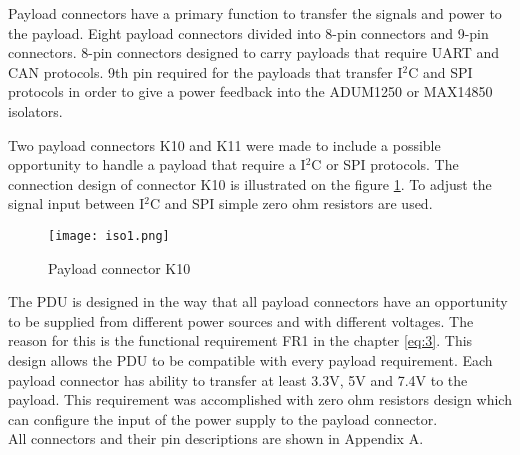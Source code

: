 Payload connectors have a primary function to transfer the signals and power to the payload. Eight payload connectors divided into 8-pin connectors and 9-pin connectors. 8-pin connectors designed to carry payloads that require UART and CAN protocols. 9th pin required for the payloads that transfer I$^2$C and SPI protocols in order to give a power feedback into the ADUM1250 or MAX14850 isolators.  

Two payload connectors K10 and K11 were made to include a possible opportunity to handle a payload that require a I$^2$C or SPI protocols.
The connection design of connector K10 is illustrated on the figure \ref{fig: iso1}. To adjust the signal input between I$^2$C and SPI simple zero ohm resistors are used.

\begin{figure}[h]
	\centering
	\texttt{[image: iso1.png]}
	\caption{Payload connector K10}
	\label{fig: iso1}
\end{figure} 
 
The PDU is designed in the way that all payload connectors have an opportunity to be supplied from different power sources and with different voltages. The reason for this is the functional requirement FR1 in the chapter \ref{eq:3}. This design allows the PDU to be compatible with every payload requirement. Each payload connector has ability to transfer at least 3.3V, 5V and 7.4V to the payload.  This requirement was accomplished with zero ohm  resistors  design which can configure the input of the power supply to the payload connector.\\

All connectors and their pin descriptions are shown in Appendix A. 

 
  
  